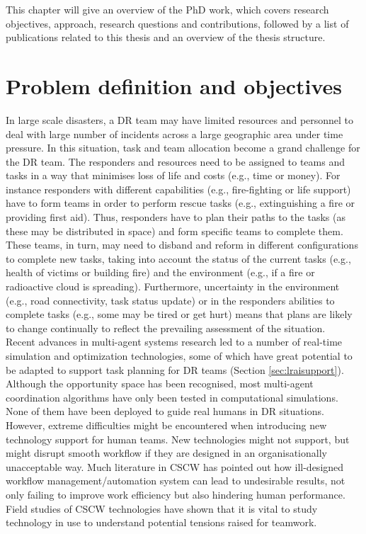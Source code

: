 This chapter will give an overview of the PhD work, which covers research objectives, approach, research questions and contributions, followed by a list of publications related to this thesis and an overview of the thesis structure.\\


\section{Problem definition and objectives}
In large scale disasters, a \ac{DR} team may have limited resources and personnel to deal with large number of incidents across a large geographic area under time pressure. In this situation, task and team allocation become a grand challenge for the \ac{DR} team. The responders and resources need to be assigned to teams and tasks in a way that minimises loss of life and costs (e.g., time or money). For instance responders with different capabilities (e.g., fire-fighting or life support) have to form teams in order to perform rescue tasks (e.g., extinguishing a fire or providing first aid). Thus, responders have to plan their paths to the tasks (as these may be distributed in space) and form specific teams to complete them. These teams, in turn, may need to disband and reform in different configurations to complete new tasks, taking into account the status of the current tasks (e.g., health of victims or building fire) and the environment (e.g., if a fire or radioactive cloud is spreading). Furthermore, uncertainty in the environment (e.g., road connectivity, task status update) or in the responders abilities to complete tasks (e.g., some may be tired or get hurt) means that plans are likely to change continually to reflect the prevailing assessment of the situation.\\

Recent advances in multi-agent systems research led to a number of real-time simulation and optimization technologies, some of which have great potential to be adapted to support task planning for \ac{DR} teams (Section \ref{sec:lraisupport}). Although the opportunity space has been recognised, most multi-agent coordination algorithms have only been tested in computational simulations. None of them have been deployed to guide real humans in \ac{DR} situations. However, extreme difficulties might be encountered when introducing new technology support for human teams. New technologies might not support, but might disrupt smooth workflow if they are designed in an organisationally unacceptable way. Much literature in \ac{CSCW} has pointed out how ill-designed workflow management/automation system can lead to undesirable results, not only failing to improve work efficiency but also hindering human performance. Field studies of \ac{CSCW} technologies have shown that it is vital to study technology in use to understand potential tensions raised for teamwork. \\


